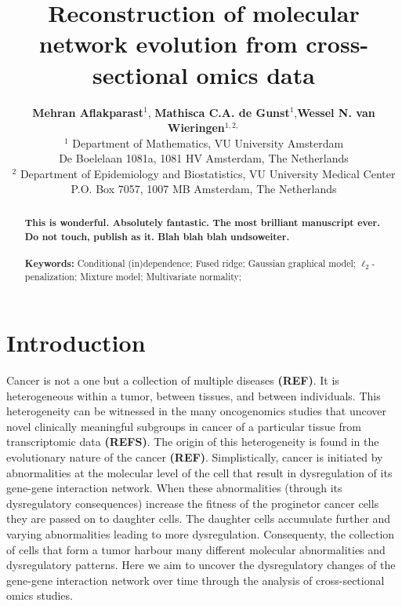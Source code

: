 \documentclass[10pt]{article}
\title{Reconstruction of molecular network evolution from cross-sectional omics data}
\author{ {\small
\textbf{Mehran Aflakparast}$^{1}$, \textbf{Mathisca C.A. de Gunst}$^{1}$,\textbf{Wessel N. van Wieringen}$^{1,2,}$%
}
\\
{\small $^1$ Department of Mathematics, VU University Amsterdam}
\\
{\small De Boelelaan 1081a, 1081 HV Amsterdam, The Netherlands}
\\
{\small $^2$ Department of Epidemiology and Biostatistics, VU University Medical Center}
\\
{\small P.O. Box 7057, 1007 MB Amsterdam, The Netherlands}
}
\date{}
\begin{document}
\maketitle


\begin{abstract}
\noindent
\textbf{This is wonderful. Absolutely fantastic. The most brilliant manuscript ever. Do not touch, publish as it. Blah blah blah undsoweiter.}
\\
\\
{\bf Keywords:}  Conditional (in)dependence; Fused ridge; Gaussian graphical model; $\ell_2$-penalization; Mixture model; Multivariate normality;
\end{abstract}




\section{Introduction}
Cancer is not a one but a collection of multiple diseases \textbf{(REF)}. It is heterogeneous within a tumor, between tissues, and between individuals. This heterogeneity can be witnessed in the many oncogenomics studies that uncover novel clinically meaningful subgroups in cancer of a particular tissue from transcriptomic data \textbf{(REFS)}. The origin of this heterogeneity is found in the evolutionary nature of the cancer \textbf{(REF)}. Simplistically, cancer is initiated by abnormalities at the molecular level of the cell that result in dysregulation of its gene-gene interaction network. When these abnormalities (through its dysregulatory consequences) increase the fitness of the proginetor cancer cells they are passed on to daughter cells. The daughter cells accumulate further and varying abnormalities leading to more dysregulation. Consequenty, the collection of cells that form a tumor harbour many different molecular abnormalities and dysregulatory patterns. Here we aim to uncover the dysregulatory changes of the gene-gene interaction network over time through the analysis of cross-sectional omics studies.
\end{document}

